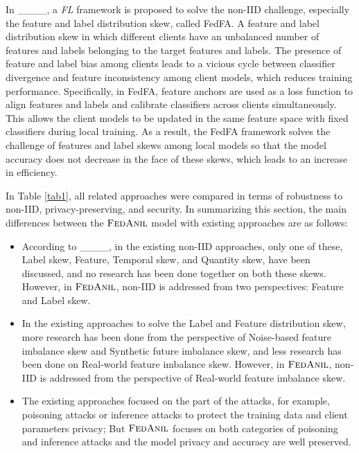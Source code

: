 In ____, a \emph{FL} framework is proposed to solve the non-IID challenge, especially the feature and label distribution skew, called FedFA. A feature and label distribution skew in which different clients have an unbalanced number of features and labels belonging to the target features and labels. The presence of feature and label bias among clients leads to a vicious cycle between classifier divergence and feature inconsistency among client models, which reduces training performance. Specifically, in FedFA, feature anchors are used as a loss function to align features and labels and calibrate classifiers across clients simultaneously. This allows the client models to be updated in the same feature space with fixed classifiers during local training. As a result, the FedFA framework solves the challenge of features and label skews among local models so that the model accuracy does not decrease in the face of these skews, which leads to an increase in efficiency.

In Table \ref{tab1}, all related approaches were compared in terms of robustness to non-IID, privacy-preserving, and security. In summarizing this section, the main differences between the $\textsc{FedAnil}$ model with existing approaches are as follows:

\vspace{-\topsep}
\begin{itemize}
  \setlength{\parskip}{0pt}
  \setlength{\itemsep}{0pt plus 1pt}
	\item According to ____, in the existing non-IID approaches, only one of these, Label skew, Feature, Temporal skew, and Quantity skew, have been discussed, and no research has been done together on both these skews. However, in $\textsc{FedAnil}$, non-IID is addressed from two perspectives: Feature and Label skew.
	\item In the existing approaches to solve the Label and Feature distribution skew, more research has been done from the perspective of Noise-based feature imbalance skew and Synthetic future imbalance skew, and less research has been done on Real-world feature imbalance skew. However, in $\textsc{FedAnil}$, non-IID is addressed from the perspective of Real-world feature imbalance skew.
	\item The existing approaches focused on the part of the attacks, for example, poisoning attacks or inference attacks to protect the training data and client parameters privacy; But {$\textsc{FedAnil}$} focuses on both categories of poisoning and inference attacks and the model privacy and accuracy are well preserved.
\end{itemize}
\vspace{-\topsep}

